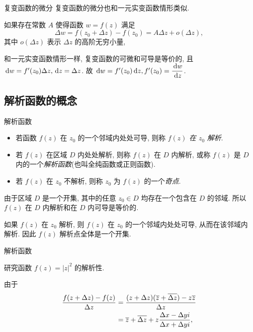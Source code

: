 \begin{frame}{复变函数的微分}
\onslide<+->
复变函数的微分也和一元实变函数情形类似.
\onslide<+->
\begin{definition}
如果存在常数 $A$ 使得函数 $w=f(z)$ 满足
\[\Delta w=f(z_0+\Delta z)-f(z_0)=A\Delta z+o(\Delta z),\]
其中 $o(\Delta z)$ 表示 $\Delta z$ 的高阶无穷小量,
\end{definition}
\onslide<+->
和一元实变函数情形一样, 复变函数的可微和可导是等价的, 且 $\,\mathrm{d} w=f'(z_0)\Delta z, \,\mathrm{d} z=\Delta z$.
\onslide<+->
故 \emph{$\,\mathrm{d} w=f'(z_0)\,\mathrm{d} z,f'(z_0)=\dfrac{\,\mathrm{d} w}{\,\mathrm{d} z}$}.
\end{frame}


\subsection{解析函数的概念}
\begin{frame}{解析函数}
\onslide<+->
\begin{definition}
\begin{itemize}
\item 若函数 $f(z)$ 在 $z_0$ 的一个邻域内处处可导, 则称 \emph{$f(z)$ 在 $z_0$ 解析}.
\item 若 $f(z)$ 在区域 $D$ 内处处解析, 则称 $f(z)$ 在 $D$ 内解析, 或称 $f(z)$ 是 $D$ 内的一个\emph{解析函数}(也叫全纯函数或正则函数).
\item 若 $f(z)$ 在 $z_0$ 不解析, 则称 $z_0$ 为 $f(z)$ 的一个\emph{奇点}.
\end{itemize}
\end{definition}
\onslide<+->
由于区域 $D$ 是一个开集, 其中的任意 $z_0\in D$ 均存在一个包含在 $D$ 的邻域. 
\onslide<+->
所以 \alert{$f(z)$ 在 $D$ 内解析和在 $D$ 内可导是等价的}.

\onslide<+->
如果 $f(z)$ 在 $z_0$ 解析, 则 $f(z)$ 在 $z_0$ 的一个邻域内处处可导, 从而在该邻域内解析.
\onslide<+->
因此 \alert{$f(z)$ 解析点全体是一个开集}.
\end{frame}


\begin{frame}{解析函数}
\onslide<+->
\begin{example}
研究函数 $f(z)=|z|^2$ 的解析性.
\end{example}
\onslide<+->
\begin{solution*}
由于
\vspace{-5pt}
\begin{align*}
\frac{f(z+\Delta z)-f(z)}{\Delta z}
&=\frac{(z+\Delta z)(\overline z+\overline{\Delta z})-z\overline z}{\Delta z}\\
&=\overline z+\overline{\Delta z}+z\frac{\Delta x-\Delta yi}{\Delta x+\Delta yi},
\end{align*}


\end{solution*}
\end{frame}


